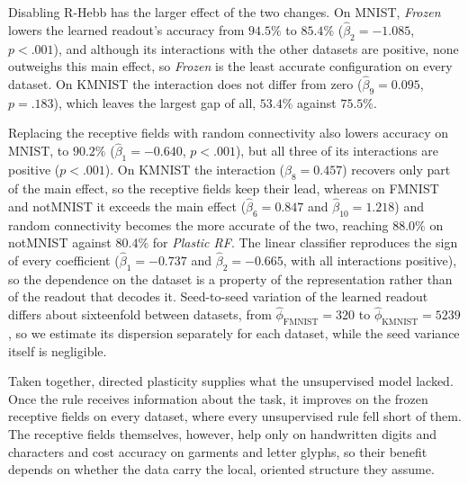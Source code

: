 
Disabling R-Hebb has the larger effect of the two changes. On MNIST, \textit{Frozen} lowers
the learned readout's accuracy from $94.5\%$ to $85.4\%$ ($\hat{\beta}_2 = -1.085$,
$p<.001$), and although its interactions with the other datasets are positive, none outweighs
this main effect, so \textit{Frozen} is the least accurate configuration on every dataset. On
KMNIST the interaction does not differ from zero ($\hat{\beta}_9 = 0.095$, $p = .183$), which
leaves the largest gap of all, $53.4\%$ against $75.5\%$.

Replacing the receptive fields with random connectivity also lowers accuracy on MNIST, to
$90.2\%$ ($\hat{\beta}_1 = -0.640$, $p<.001$), but all three of its interactions are positive
($p<.001$). On KMNIST the interaction ($\hat{\beta}_8 = 0.457$) recovers only part of the main
effect, so the receptive fields keep their lead, whereas on FMNIST and notMNIST it exceeds
the main effect ($\hat{\beta}_6 = 0.847$ and $\hat{\beta}_{10} = 1.218$) and random
connectivity becomes the more accurate of the two, reaching $88.0\%$ on notMNIST against
$80.4\%$ for \textit{Plastic RF}. The linear classifier reproduces the sign of every
coefficient ($\hat{\beta}_1 = -0.737$ and $\hat{\beta}_2 = -0.665$, with all interactions
positive), so the dependence on the dataset is a property of the representation rather than
of the readout that decodes it. Seed-to-seed variation of the learned readout differs about
sixteenfold between datasets, from $\hat{\phi}_{\text{FMNIST}} = 320$ to
$\hat{\phi}_{\text{KMNIST}} = 5239$, so we estimate its dispersion separately for each
dataset, while the seed variance itself is negligible.

Taken together, directed plasticity supplies what the unsupervised model lacked. Once the
rule receives information about the task, it improves on the frozen receptive fields on every
dataset, where every unsupervised rule fell short of them. The receptive fields themselves,
however, help only on handwritten digits and characters and cost accuracy on garments and
letter glyphs, so their benefit depends on whether the data carry the local, oriented
structure they assume.
